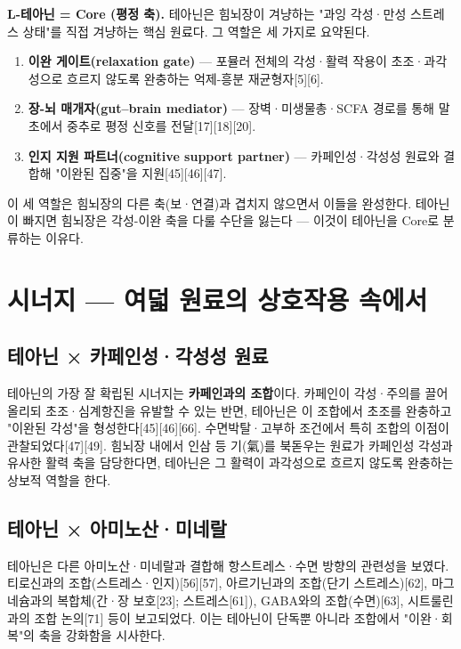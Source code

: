 \documentclass[11pt,oneside]{book}
\begin{document}
\textbf{L-테아닌 = Core (평정 축).} 테아닌은 힘뇌장이 겨냥하는 "과잉 각성·만성 스트레스 상태"를 직접 겨냥하는 핵심 원료다. 그 역할은 세 가지로 요약된다.

\begin{enumerate}[leftmargin=6mm,itemsep=1pt,topsep=2pt]
  \item \textbf{이완 게이트(relaxation gate)} — 포뮬러 전체의 각성·활력 작용이 초조·과각성으로 흐르지 않도록 완충하는 억제-흥분 재균형자[5][6].
  \item \textbf{장-뇌 매개자(gut–brain mediator)} — 장벽·미생물총·SCFA 경로를 통해 말초에서 중추로 평정 신호를 전달[17][18][20].
  \item \textbf{인지 지원 파트너(cognitive support partner)} — 카페인성·각성성 원료와 결합해 "이완된 집중"을 지원[45][46][47].
\end{enumerate}
이 세 역할은 힘뇌장의 다른 축(보·연결)과 겹치지 않으면서 이들을 완성한다. 테아닌이 빠지면 힘뇌장은 각성-이완 축을 다룰 수단을 잃는다 — 이것이 테아닌을 Core로 분류하는 이유다.

\section{시너지 — 여덟 원료의 상호작용 속에서}
\subsection{테아닌 × 카페인성·각성성 원료}
테아닌의 가장 잘 확립된 시너지는 \textbf{카페인과의 조합}이다. 카페인이 각성·주의를 끌어올리되 초조·심계항진을 유발할 수 있는 반면, 테아닌은 이 조합에서 초조를 완충하고 "이완된 각성"을 형성한다[45][46][66]. 수면박탈·고부하 조건에서 특히 조합의 이점이 관찰되었다[47][49]. 힘뇌장 내에서 인삼 등 기(氣)를 북돋우는 원료가 카페인성 각성과 유사한 활력 축을 담당한다면, 테아닌은 그 활력이 과각성으로 흐르지 않도록 완충하는 상보적 역할을 한다.

\subsection{테아닌 × 아미노산·미네랄}
테아닌은 다른 아미노산·미네랄과 결합해 항스트레스·수면 방향의 관련성을 보였다. 티로신과의 조합(스트레스·인지)[56][57], 아르기닌과의 조합(단기 스트레스)[62], 마그네슘과의 복합체(간·장 보호[23]; 스트레스[61]), GABA와의 조합(수면)[63], 시트룰린과의 조합 논의[71] 등이 보고되었다. 이는 테아닌이 단독뿐 아니라 조합에서 "이완·회복"의 축을 강화함을 시사한다.
\end{document}
